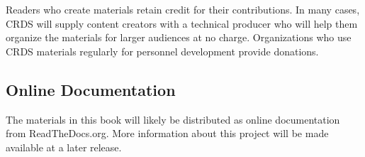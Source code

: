 \documentclass[float=false, crop=false]{standalone}
\begin{document}
Readers who create materials retain credit for their contributions. In many cases, CRDS will supply content creators with a technical producer who will help them organize the materials for larger audiences at no charge. Organizations who use CRDS materials regularly for personnel development provide donations.

\subsection{Online Documentation}
The materials in this book will likely be distributed as online documentation from ReadTheDocs.org. More information about this project will be made available at a later release. 
\end{document}
